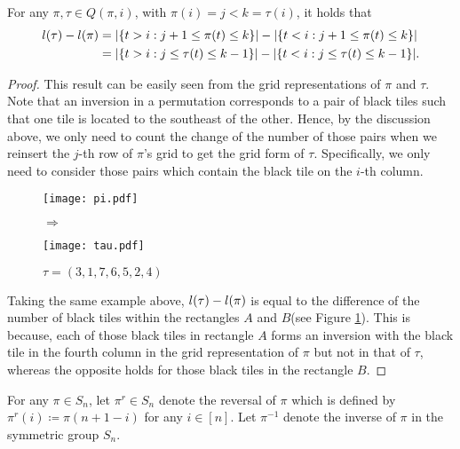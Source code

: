 \begin{proposition}\label{P1}
For any $\pi, \tau\in Q(\pi, i)$, with $\pi(i) = j < k = \tau(i)$, it holds that
\begin{align*}
l(\tau) - l(\pi) &= |\{ t > i : j+1 \le \pi(t) \le k \}| - |\{ t < i : j+1 \le \pi(t) \le k \}|\\
                       &= |\{ t > i : j \le \tau(t) \le k-1 \}| - |\{ t < i : j \le \tau(t) \le k-1 \}|.
\end{align*}
\end{proposition}
\begin{proof}
This result can be easily seen from the grid representations of $\pi$ and $\tau$. Note that an inversion in a permutation corresponds to a pair of black tiles such that one tile is located to the southeast of the other. Hence, by the discussion above, we only need to count the change of the number of those pairs when we reinsert the $j$-th row of $\pi$'s grid to get the grid form of $\tau$. Specifically, we only need to consider those pairs which contain the black tile on the $i$-th column.
\begin{figure}[h]
\hfill
\begin{minipage}[b]{0.4\textwidth} \centering
\texttt{[image: pi.pdf]}
\caption*{\small$\pi = (4,1,7,3,6,2,5)$}
\end{minipage}
\begin{minipage}[t]{0.1\textwidth} \centering
\vspace{-2.3cm}
$\Longrightarrow$
\vspace{2cm}
\caption{}\label{fg:3}
\end{minipage}
\begin{minipage}[b]{0.4\textwidth} \centering
\texttt{[image: tau.pdf]}
\caption*{\small$\tau = (3,1,7,6,5,2,4)$}
\end{minipage}
\hfill
\end{figure}

Taking the same example above, $l(\tau) - l(\pi)$ is equal to the difference of the number of black tiles within the rectangles $A$ and $B$(see Figure \ref{fg:3}). This is because, each of those black tiles in rectangle $A$ forms an inversion with the black tile in the fourth column in the grid representation of $\pi$ but not in that of $\tau$, whereas the opposite holds for those black tiles in the rectangle $B$.
\end{proof}

\begin{definition}
For any $\pi \in S_n$, let $\pi^r \in S_n$ denote the reversal of $\pi$ which is defined by $\pi^r(i) \coloneqq \pi(n+1-i)$ for any $i \in [n]$. Let $\pi^{-1}$ denote the inverse of $\pi$ in the symmetric group $S_n$.
\end{definition}


